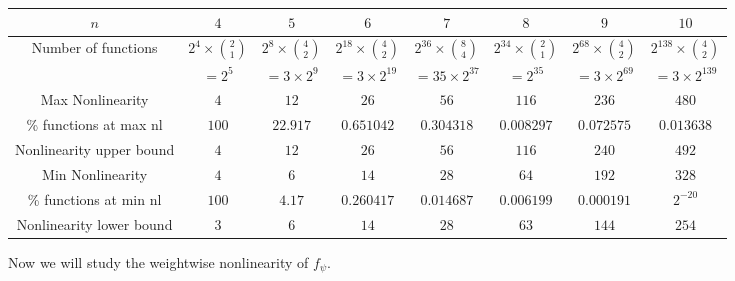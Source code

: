 \documentclass{llncs}
\begin{document}
\begin{center}
\begin{tabular}{|c|c|c|c||c|c|c|c|}\hline
$n$ & $4$ & $5$ & $6$ & $7$ & $8$ & $9$ & $10$\\ \hline
Number of functions & $2^4 \times \binom{2}{1}$ & $2^8 \times \binom{4}{2}$ & $2^{18} \times \binom{4}{2}$&$2^{36} \times \binom{8}{4}$&$2^{34} \times \binom{2}{1}$& $2^{68} \times \binom{4}{2}$& $2^{138} \times \binom{4}{2}$\\
& $ = 2^5$& $= 3\times 2^9$& $= 3\times 2^{19}$& $= 35\times 2^{37}$&$ = 2^{35}$&$= 3\times 2^{69}$& $= 3\times 2^{139}$\\ \hline
Max Nonlinearity & $4$ & $12$ & $26$ & $56$ & $116$ & $236$ & $480$\\ \hline
\% functions at max nl & $100$ & $22.917$ & $0.651042$ & $0.304318$ & $0.008297$ & $0.072575$ & $0.013638$\\ \hline
Nonlinearity upper bound & $4$ & $12$ & $26$ & $56$ & $116$ & $240$ & $492$\\ \hline
Min Nonlinearity & $4$ & $6$ & $14$ & $28$ & $64$ & $192$ & $328$\\ \hline
\% functions at min nl & $100$ & $4.17$ & $0.260417$ & $0.014687$ & $0.006199$ & $0.000191$ & $2^{-20}$\\ \hline
Nonlinearity lower bound & $3$ & $6$ & $14$ & $28$ & $63$ & $144$ & $254$\\ \hline
\end{tabular}
\end{center}
Now we will study the weightwise nonlinearity of $f_\psi$.
\end{document}
